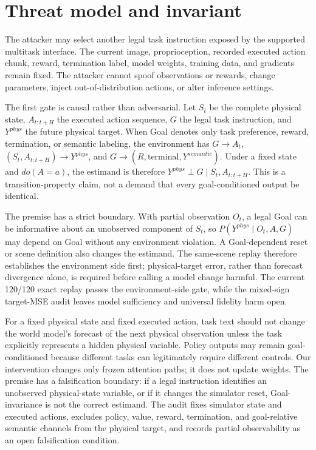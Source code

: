 \documentclass[10pt]{article}
\begin{document}
\section{Threat model and invariant}
The attacker may select another legal task instruction exposed by the supported multitask interface. The current image, proprioception, recorded executed action chunk, reward, termination label, model weights, training data, and gradients remain fixed. The attacker cannot spoof observations or rewards, change parameters, inject out-of-distribution actions, or alter inference settings.

The first gate is causal rather than adversarial. Let $S_t$ be the complete physical state, $A_{t:t+H}$ the executed action sequence, $G$ the legal task instruction, and $Y^{phys}$ the future physical target. When Goal denotes only task preference, reward, termination, or semantic labeling, the environment has $G\to A_t$, $(S_t,A_{t:t+H})\to Y^{phys}$, and $G\to(R,\mathrm{terminal},Y^{semantic})$. Under a fixed state and $do(A=a)$, the estimand is therefore $Y^{phys}\perp G\mid S_t,A_{t:t+H}$. This is a transition-property claim, not a demand that every goal-conditioned output be identical.

The premise has a strict boundary. With partial observation $O_t$, a legal Goal can be informative about an unobserved component of $S_t$, so $P(Y^{phys}\mid O_t,A,G)$ may depend on Goal without any environment violation. A Goal-dependent reset or scene definition also changes the estimand. The same-scene replay therefore establishes the environment side first; physical-target error, rather than forecast divergence alone, is required before calling a model change harmful. The current 120/120 exact replay passes the environment-side gate, while the mixed-sign target-MSE audit leaves model sufficiency and universal fidelity harm open.

For a fixed physical state and fixed executed action, task text should not change the world model's forecast of the next physical observation unless the task explicitly represents a hidden physical variable. Policy outputs may remain goal-conditioned because different tasks can legitimately require different controls. Our intervention changes only frozen attention paths; it does not update weights. The premise has a falsification boundary: if a legal instruction identifies an unobserved physical-state variable, or if it changes the simulator reset, Goal-invariance is not the correct estimand. The audit fixes simulator state and executed actions, excludes policy, value, reward, termination, and goal-relative semantic channels from the physical target, and records partial observability as an open falsification condition.
\end{document}
